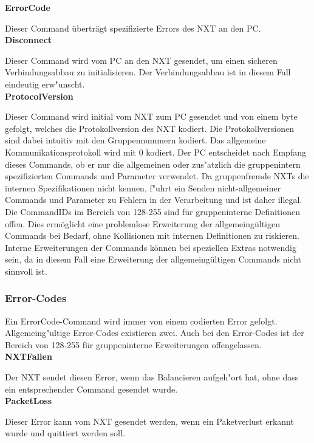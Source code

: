 \documentclass[oneside,abstractoff,a4paper]{scrartcl}
\begin{document}
\noindent\textbf{ErrorCode}

Dieser Command überträgt spezifizierte Errors des NXT an den PC. \\

\noindent\textbf{Disconnect}

Dieser Command wird vom PC an den NXT gesendet, um einen sicheren Verbindungsabbau zu initialisieren. Der Verbindungsabbau ist in diesem Fall eindeutig erw"unscht. \\

\noindent\textbf{ProtocolVersion}

Dieser Command wird initial vom NXT zum PC gesendet und von einem byte gefolgt, welches die Protokollversion des NXT kodiert. Die Protokollversionen sind dabei intuitiv mit den Gruppennummern kodiert. Das allgemeine Kommunikationsprotokoll wird mit 0 kodiert. Der PC entscheidet nach Empfang dieses Commands, ob er nur die allgemeinen oder zus"atzlich die gruppenintern spezifizierten Commands und Parameter verwendet. Da gruppenfremde NXTs die internen Spezifikationen nicht kennen, f"uhrt ein Senden nicht-allgemeiner Commands und Parameter zu Fehlern in der Verarbeitung und ist daher illegal. \\

\noindent Die CommandIDs im Bereich von 128-255 sind für gruppeninterne Definitionen offen. Dies ermöglicht eine problemlose Erweiterung der allgemeingültigen Commands bei Bedarf, ohne Kollisionen mit internen Definitionen zu riskieren. Interne Erweiterungen der Commands können bei speziellen Extras notwendig sein, da in diesem Fall eine Erweiterung der allgemeingültigen Commands nicht sinnvoll ist.

\subsubsection{Error-Codes}
Ein ErrorCode-Command wird immer von einem codierten Error gefolgt. Allgemeing"ultige Error-Codes existieren zwei. Auch bei den Error-Codes ist der Bereich von 128-255 für gruppeninterne Erweiterungen offengelassen. \\

\noindent\textbf{NXTFallen}

Der NXT sendet diesen Error, wenn das Balancieren aufgeh"ort hat, ohne dass ein entsprechender Command gesendet wurde. \\

\noindent\textbf{PacketLoss}

Dieser Error kann vom NXT gesendet werden, wenn ein Paketverlust erkannt wurde und quittiert werden soll.
\end{document}
